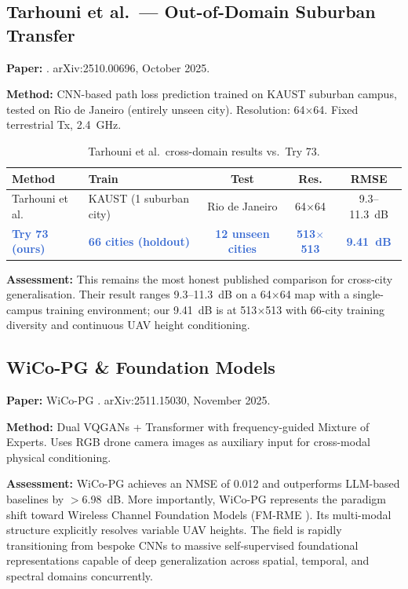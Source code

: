 \documentclass[11pt,a4paper]{article}
\newcommand{\ours}[1]{\textcolor{highlight}{\textbf{#1}}}
\begin{document}
\subsection{Tarhouni et al.\ --- Out-of-Domain Suburban Transfer}

\textbf{Paper:} \cite{tarhouni2025}. arXiv:2510.00696, October 2025.

\textbf{Method:} CNN-based path loss prediction trained on KAUST suburban campus, tested on Rio de Janeiro (entirely unseen city). Resolution: 64$\times$64. Fixed terrestrial Tx, 2.4~GHz.

\begin{table}[h!]
\centering
\caption{Tarhouni et al.\ cross-domain results vs.\ Try 73.}
\label{tab:tarhouni}
\begin{tabularx}{\textwidth}{lXccc}
\toprule
\textbf{Method} & \textbf{Train} & \textbf{Test} & \textbf{Res.} & \textbf{RMSE} \\
\midrule
Tarhouni et al. & KAUST (1 suburban city) & Rio de Janeiro & 64$\times$64 & 9.3--11.3~dB \\
\ours{Try 73 (ours)} & \ours{66 cities (holdout)} & \ours{12 unseen cities} & \ours{513$\times$513} & \ours{9.41~dB} \\
\bottomrule
\end{tabularx}
\end{table}

\textbf{Assessment:} This remains the most honest published comparison for cross-city generalisation. Their result ranges 9.3--11.3~dB on a 64$\times$64 map with a single-campus training environment; our 9.41~dB is at 513$\times$513 with 66-city training diversity and continuous UAV height conditioning.

\subsection{WiCo-PG \& Foundation Models}

\textbf{Paper:} WiCo-PG \cite{wicopg2025}. arXiv:2511.15030, November 2025.

\textbf{Method:} Dual VQGANs + Transformer with frequency-guided Mixture of Experts. Uses RGB drone camera images as auxiliary input for cross-modal physical conditioning.

\textbf{Assessment:} WiCo-PG achieves an NMSE of 0.012 and outperforms LLM-based baselines by $>$6.98~dB. More importantly, WiCo-PG represents the paradigm shift toward Wireless Channel Foundation Models (FM-RME \cite{fmrme2026}). Its multi-modal structure explicitly resolves variable UAV heights. The field is rapidly transitioning from bespoke CNNs to massive self-supervised foundational representations capable of deep generalization across spatial, temporal, and spectral domains concurrently.
\end{document}
